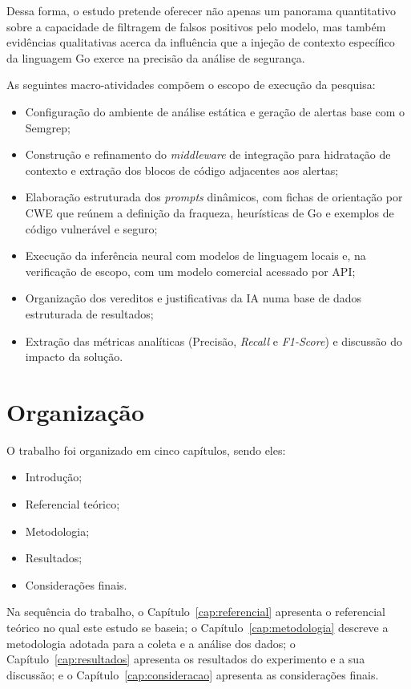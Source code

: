 Dessa forma, o estudo pretende oferecer não apenas um panorama quantitativo sobre a capacidade de filtragem de falsos positivos pelo modelo, mas também evidências qualitativas acerca da influência que a injeção de contexto específico da linguagem Go exerce na precisão da análise de segurança.

As seguintes macro-atividades compõem o escopo de execução da pesquisa:

\begin{itemize}
    \item Configuração do ambiente de análise estática e geração de alertas base com o Semgrep;
    \item Construção e refinamento do \textit{middleware} de integração para hidratação de contexto e extração dos blocos de código adjacentes aos alertas;
    \item Elaboração estruturada dos \textit{prompts} dinâmicos, com fichas de orientação por CWE que reúnem a definição da fraqueza, heurísticas de Go e exemplos de código vulnerável e seguro;
    \item Execução da inferência neural com modelos de linguagem locais e, na verificação de escopo, com um modelo comercial acessado por API;
    \item Organização dos vereditos e justificativas da IA numa base de dados estruturada de resultados;
    \item Extração das métricas analíticas (Precisão, \textit{Recall} e \textit{F1-Score}) e discussão do impacto da solução.
\end{itemize}

\section{Organização}
O trabalho foi organizado em cinco capítulos, sendo eles:

\begin{itemize}
    \item Introdução;
    \item Referencial teórico;
    \item Metodologia;
    \item Resultados;
    \item Considerações finais.
\end{itemize}

Na sequência do trabalho, o Capítulo~\ref{cap:referencial} apresenta o referencial teórico no qual este estudo se baseia; o Capítulo~\ref{cap:metodologia} descreve a metodologia adotada para a coleta e a análise dos dados; o Capítulo~\ref{cap:resultados} apresenta os resultados do experimento e a sua discussão; e o Capítulo~\ref{cap:consideracao} apresenta as considerações finais.